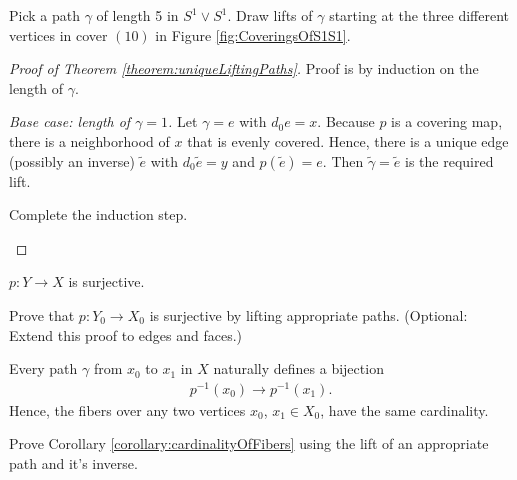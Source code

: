   \begin{qbox}
    Pick a path $\gamma$ of length 5 in $S^1 \vee S^1$.
    Draw lifts of $\gamma$ starting at the three different vertices in cover $(10)$ in Figure \ref{fig:CoveringsOfS1S1}.
  \end{qbox}

  \begin{proof}[Proof of Theorem \ref{theorem:uniqueLiftingPaths}]
    Proof is by induction on the length of $\gamma$.

    \emph{Base case: length of $\gamma = 1$.}
    Let $\gamma = e$ with $d_0 e = x$.
    Because $p$ is a covering map, there is a neighborhood of $x$ that is evenly covered. Hence, there is a unique edge (possibly an inverse) $\widetilde{e}$ with $d_0 \widetilde{e} = y$ and $p(\widetilde{e}) = e$. Then $\widetilde{\gamma} = \widetilde{e}$ is the required lift.
    \begin{qbox}
      Complete the induction step.
    \end{qbox}
  \end{proof}

    \begin{corollary}
      \label{corollary:surjectivityOfCovers}
      $p:Y \rightarrow X$ is surjective.
    \end{corollary}
    \begin{qbox}
      Prove that $p:Y_0 \rightarrow X_0$ is surjective by lifting appropriate paths. (Optional: Extend this proof to edges and faces.)
    \end{qbox}
    \begin{corollary}
      \label{corollary:cardinalityOfFibers}
      Every path $\gamma$ from $x_0$ to $x_1$ in $X$ naturally defines a bijection
      \begin{align*}
        p^{-1}(x_0) \longrightarrow p^{-1}(x_1).
      \end{align*}
      Hence, the fibers over any two vertices $x_0$, $x_1 \in X_0$, have the same cardinality.
    \end{corollary}
    \begin{qbox}
      Prove Corollary \ref{corollary:cardinalityOfFibers} using the lift of an appropriate path and it's inverse.
    \end{qbox}














